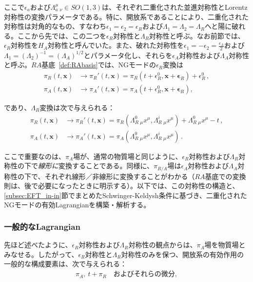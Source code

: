 ここで$\epsilon_a$および$\Lambda_a^\mu\,{}_\nu\in SO(1,3)$は、それぞれ二重化された並進対称性とLorentz対称性の変換パラメータである。特に、開放系であることにより、二重化された対称性は対角的なもの、すなわち$\epsilon_1=\epsilon_2=\epsilon_R$および$\Lambda_1=\Lambda_2=\Lambda_R$へと陽に破れる。ここから先では、この二つを$\epsilon_R$対称性と$\Lambda_R$対称性と呼ぶ。なお前節では、$\epsilon_R$対称性を$H_A$対称性と呼んでいた。また、破れた対称性を$\displaystyle\epsilon_1=-\epsilon_2=\frac{\epsilon_A}{2}$および$\Lambda_1=(\Lambda_2)^{-1}=(\Lambda_A)^{1/2}$とパラメータ化し、それらを$\epsilon_A$対称性および$\Lambda_A$対称性と呼ぶ。$RA$基底~\eqref{def:RAbasis}では、NGモードの$\epsilon_R$変換は
\begin{align}
\label{R_translations_R}
 \pi_R(t,\mathbf{x})
 &\to \pi_R'(t,\mathbf{x})
 = \pi_R\left(t+\epsilon^0_R,\mathbf{x}+\boldsymbol{\epsilon}_R\right)+\epsilon^0_R\,,
\\
\label{R_translations_A}
  \pi_A(t,\mathbf{x})
 &\to \pi_A'(t,\mathbf{x})
 = \pi_A\left(t+\epsilon^0_R,\mathbf{x}+\boldsymbol{\epsilon}_R\right),
\end{align}

であり、$\Lambda_R$変換は次で与えられる：
\begin{align}
\label{R_Lorentz_R}
\pi_R(t,\mathbf{x})
 &\to \pi_R' (t,\mathbf{x}) 
 = \pi_R \left(\Lambda_R^0\,{}_\mu x^\mu,\Lambda_R^i\,{}_\mu x^\mu\right)+\Lambda_R^0\,{}_\mu x^\mu-t\,,
 \\
\label{R_Lorentz_A}
 \pi_A(t,\mathbf{x})
 &\to \pi_A' (t,\mathbf{x}) 
 = \pi_A \left(\Lambda_R^0\,{}_\mu x^\mu,\Lambda_R^i\,{}_\mu x^\mu\right)\,.
\end{align}

ここで重要なのは、$\pi_A$場が、通常の物質場と同じように、$\epsilon_R$対称性および$\Lambda_R$対称性の下で\textit{線形に}変換することである。同様に、$\pi_{R/A}$場は$\epsilon_A$対称性および$\Lambda_A$対称性の下で、それぞれ線形／非線形に変換することがわかる（$RA$基底での変換則は、後で必要になったときに明示する）。以下では、この対称性の構造と、\ref{subsec:EFT_in-in}節でまとめたSchwinger-Keldysh条件に基づき、二重化されたNGモードの有効Lagrangianを構築・解析する。

\subsubsection{一般的なLagrangian}

先ほど述べたように、$\epsilon_R$対称性および$\Lambda_R$対称性の観点からは、$\pi_A$場を物質場とみなせる。したがって、$\epsilon_R$対称性と$\Lambda_R$対称性のみを保つ、開放系の有効作用の一般的な構成要素は、次で与えられる：
\begin{align}
\pi_{A},~t+\pi_{R} \quad\text{およびそれらの微分},
\label{ingredients}
\end{align}

